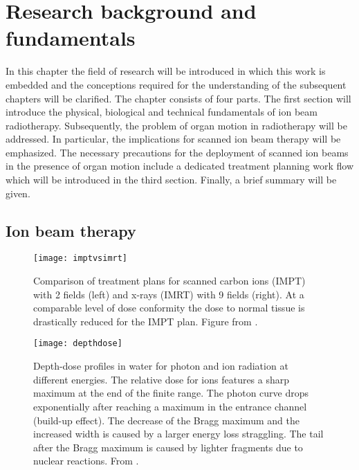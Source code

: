 %
%
%

\chapter{Research background and fundamentals}
\label{chap:background}
In this chapter the field of research will be introduced in which this
work is embedded and the conceptions required for the understanding of
the subsequent chapters will be clarified. The chapter consists of
four parts. The first section will introduce the physical, biological
and technical fundamentals of ion beam radiotherapy. Subsequently, the
problem of organ motion in radiotherapy will be addressed. In
particular, the implications for scanned ion beam therapy will be
emphasized. The necessary precautions for the deployment of scanned
ion beams in the presence of organ motion include a dedicated
treatment planning work flow which will be introduced in the third
section. Finally, a brief summary will be given.

\section{Ion beam therapy}

%
%
\begin{figure}[p]
  \centering
  \texttt{[image: imptvsimrt]}
  \caption[Comparison of treatment plans for \acs{IMPT} and
  \acs{IMRT}]{Comparison of treatment plans for scanned carbon ions
    (\acl{IMPT}) with 2 fields (left) and x-rays (\acl{IMRT}) with 9
    fields (right). At a comparable level of dose conformity the dose to
    normal tissue is drastically reduced for the \ac{IMPT} plan. 
    Figure from \citep{Amaldi2005}. }
  \label{fig:background:imptvsimrt}
\end{figure}

%
%
\begin{figure}[p]
  \centering
  \texttt{[image: depthdose]}
  \caption[Depth-dose profiles for photons and \Ctw ions at different
  energies in water.]{Depth-dose profiles in water for photon and \Ctw
    ion radiation at different energies. The relative dose for \Ctw
    ions features a sharp maximum at the end of the finite range.  The
    photon curve drops exponentially after reaching a maximum in the
    entrance channel (build-up effect). The decrease of the Bragg
    maximum and the increased width is caused by a larger energy loss
    straggling. The tail after the Bragg maximum is caused by
    lighter fragments due to nuclear reactions. From
    \citet{Schardt2010}.}
  \label{fig:background:depthdose}
\end{figure}

